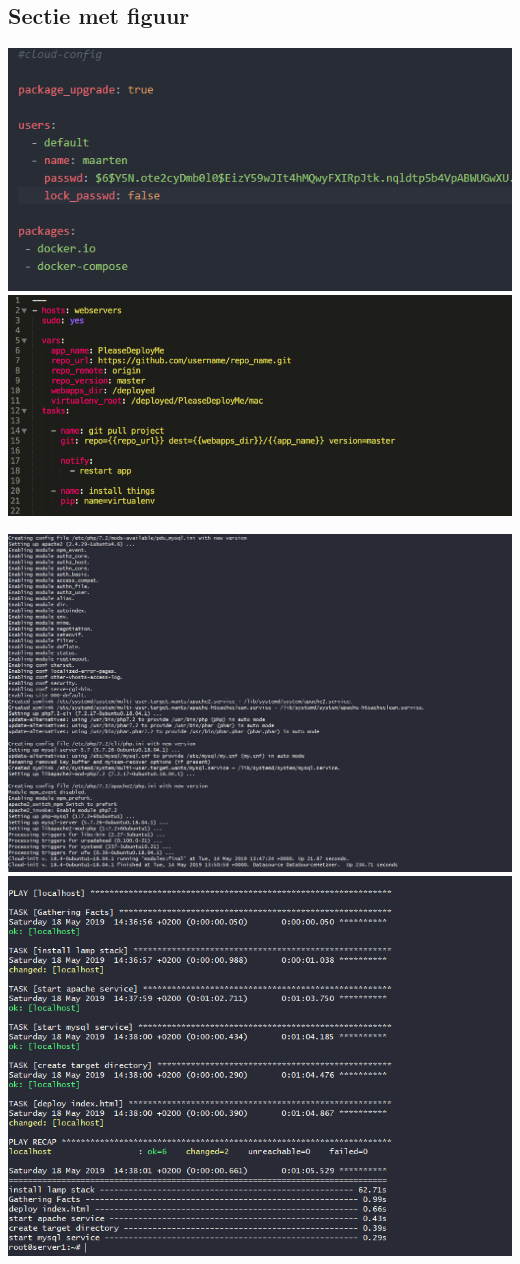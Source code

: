 \documentclass[a0,portrait]{a0poster}
\begin{document}
\begin{multicols}{2}
\color{HoGentAccent1} 
\section*{Sectie met figuur}
\color{black}


\begin{center}\vspace{1cm}
    \includegraphics[width=0.49\linewidth]{cloudconfig}
    \includegraphics[width=0.49\linewidth]{playbookex}
\end{center}\vspace{1cm}

\begin{center}\vspace{1cm}
    \includegraphics[width=0.49\linewidth]{cloudoutput}
    \includegraphics[width=0.49\linewidth]{ansibleoutput}
\end{center}\vspace{1cm}


\end{multicols}
\end{document}
